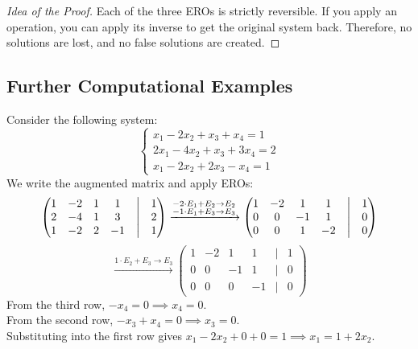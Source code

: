 \begin{proof}[Idea of the Proof]
Each of the three EROs is strictly reversible. If you apply an operation, you can apply its inverse to get the original system back. Therefore, no solutions are lost, and no false solutions are created.
\end{proof}

\subsection{Further Computational Examples}

\begin{example}
Consider the following system:
\begin{equation*}
\begin{cases}
x_1 - 2x_2 + x_3 + x_4 = 1 \\
2x_1 - 4x_2 + x_3 + 3x_4 = 2 \\
x_1 - 2x_2 + 2x_3 - x_4 = 1
\end{cases}
\end{equation*}
We write the augmented matrix and apply EROs:
\[
\begin{pmatrix}
1 & -2 & 1 & 1 & \big| & 1 \\
2 & -4 & 1 & 3 & \big| & 2 \\
1 & -2 & 2 & -1 & \big| & 1 
\end{pmatrix}
\xrightarrow{\begin{subarray}{l} -2 \cdot E_1 + E_2 \to E_2 \\ -1 \cdot E_1 + E_3 \to E_3 \end{subarray}}
\begin{pmatrix}
1 & -2 & 1 & 1 & \big| & 1 \\
0 & 0 & -1 & 1 & \big| & 0 \\
0 & 0 & 1 & -2 & \big| & 0 
\end{pmatrix}
\]
\[
\xrightarrow{1 \cdot E_2 + E_3 \to E_3}
\begin{pmatrix}
1 & -2 & 1 & 1 & \big| & 1 \\
0 & 0 & -1 & 1 & \big| & 0 \\
0 & 0 & 0 & -1 & \big| & 0 
\end{pmatrix}
\]
From the third row, $-x_4 = 0 \implies x_4 = 0$. \\
From the second row, $-x_3 + x_4 = 0 \implies x_3 = 0$. \\
Substituting into the first row gives $x_1 - 2x_2 + 0 + 0 = 1 \implies x_1 = 1 + 2x_2$.


\end{example}
